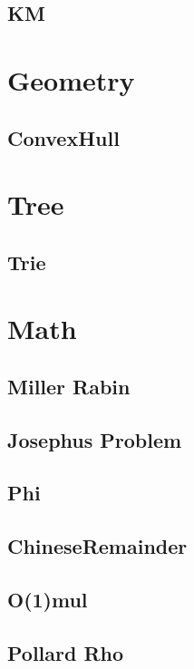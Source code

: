 	\subsection{KM}
		
		
\section{Geometry}
		\subsection{ConvexHull}
		

\section{Tree}
		\subsection{Trie}
		
				
\section{Math}
		\subsection{Miller Rabin}
		
		\subsection{Josephus Problem}
		
		\subsection{Phi}
		
		\subsection{ChineseRemainder}
		
		\subsection{O(1)mul}
		
		\newpage
		\subsection{Pollard Rho}
		
